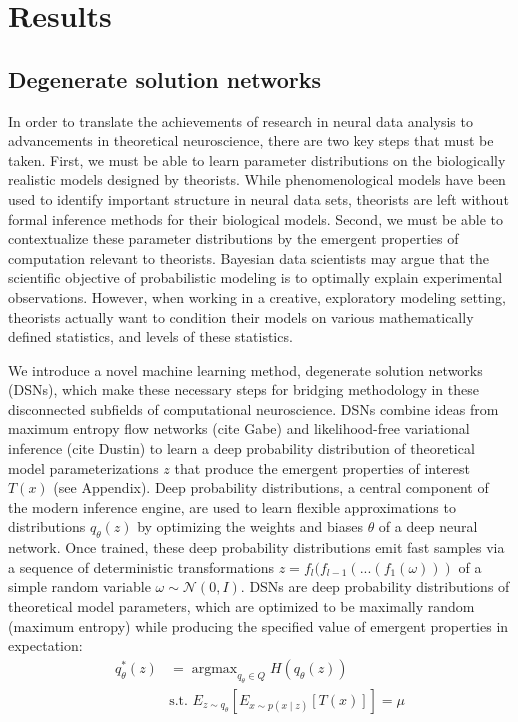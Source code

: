 \documentclass[11pt]{article}
\DeclareMathOperator*{\argmax}{argmax}
\begin{document}
\section{Results}
\subsection{Degenerate solution networks}
In order to translate the achievements of research in neural data analysis to advancements in theoretical neuroscience, there are two key steps that must be taken. First, we must be able to learn parameter distributions on the biologically realistic models designed by theorists.  While phenomenological models have been used to identify important structure in neural data sets, theorists are left without formal inference methods for their biological models.  Second, we must be able to contextualize these parameter distributions by the emergent properties of computation relevant to theorists.  Bayesian data scientists may argue that the scientific objective of probabilistic modeling is to optimally explain experimental observations.  However, when working in a creative, exploratory modeling setting, theorists actually want to  condition their models on various mathematically defined statistics, and levels of these statistics.

We introduce a novel machine learning method, degenerate solution networks (DSNs), which make these necessary steps for bridging methodology in these disconnected subfields of computational neuroscience.  DSNs combine ideas from maximum entropy flow networks (cite Gabe) and likelihood-free variational inference (cite Dustin) to learn a deep probability distribution of theoretical model parameterizations $z$ that produce the emergent properties of interest $T(x)$ (see Appendix).  Deep probability distributions, a central component of the modern inference engine, are used to learn flexible approximations to distributions $q_\theta(z)$ by optimizing the weights and biases $\theta$ of a deep neural network.  Once trained, these deep probability distributions emit fast samples via a sequence of deterministic transformations $z = f_l(f_{l-1}( ... (f_1(\omega)))$ of a simple random variable $\omega \sim \mathcal{N}(0, I)$. DSNs are deep probability distributions of theoretical model parameters, which are optimized to be maximally random (maximum entropy) while producing the specified value of emergent properties in expectation:
\begin{equation}
\begin{split}
q_\theta^*(z) &= \argmax_{q_\theta \in Q} H(q_\theta(z)) \\
 &  \text{s.t.  } E_{z \sim q_\theta}\left[ E_{x\sim p(x \mid z)}\left[T(x)\right] \right] = \mu \\
 \end{split}
\end{equation}
\end{document}
